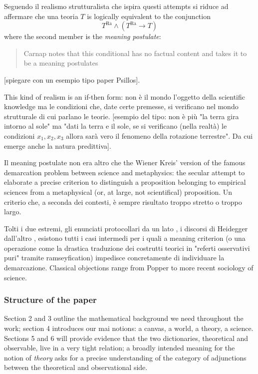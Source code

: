 Seguendo \cite{psillos} il realismo strutturalista che ispira questi attempts si riduce ad affermare che una teoria $T$ is logically equivalent to the conjunction
\[ T^\text{Ra} \land (T^\text{Ra} \rightarrow T)
\] where the second member is the \emph{meaning postulate}:
\begin{quotation}
	Carnap notes that this conditional has no factual content and takes it to be a meaning postulates \cite{psillos}
\end{quotation}
[spiegare con un esempio tipo paper Psillos].

This kind of realism is an if-then form: non è il mondo l'oggetto della scientific knowledge ma le condizioni che, date certe premesse, si verificano nel mondo strutturale di cui parlano le teorie. [esempio del tipo: non è più "la terra gira intorno al sole" ma "dati la terra e il sole, se si verificano (nella realtà) le condizioni $x_1,x_2,x_3$ allora sarà vero il fenomeno della rotazione terrestre". Da cui emerge anche la natura predittiva]. 

Il meaning postulate non era altro che the Wiener Kreis' version of the famous demarcation problem between science and metaphysics: the secular attempt to elaborate a precise criterion to distinguish a proposition belonging to empirical sciences from a metaphysical (or, at large, not scientifical) proposition. Un criterio che, a seconda dei contesti, è sempre risultato troppo stretto o troppo largo. 

Tolti i due estremi, gli enunciati protocollari da un lato \cite{?}, i discorsi di Heidegger dall'altro \cite{?}, esistono tutti i casi intermedi per i quali a meaning criterion (o una operazione come la drastica traduzione dei costrutti teorici in "referti osservativi puri" tramite ramseyfication) impedisce concretamente di individuare la demarcazione. Classical objections range from Popper \cite{?} to more recent sociology of science.
\subsubsection*{Structure of the paper}
Section 2 and 3 outline the mathematical background we need throughout the work; section 4 introduces our mai notions: a canvas, a world, a theory, a science. Sections 5 and 6 will provide evidence that the two dictionaries, theoretical and observable, live in a very tight relation; a broadly intended meaning for the notion of \emph{theory} asks for a precise understanding of the category of adjunctions between the theoretical and observational side.
\color{black}

